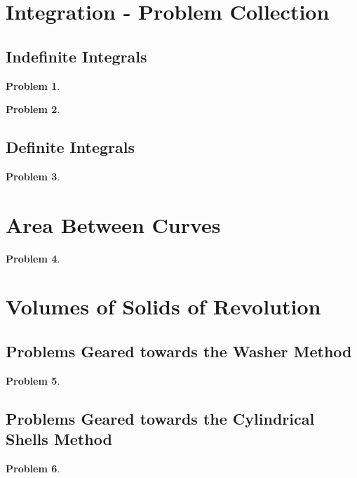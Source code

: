 \documentclass{article}
\newtheorem{problem}{Problem}
\begin{document}
\section{Integration - Problem Collection}
\subsection{Indefinite Integrals}
\begin{problem}

\end{problem}

\begin{problem}

\end{problem}
\subsection{Definite Integrals}
\begin{problem}

\end{problem}
\section{Area Between Curves}
\begin{problem}

\end{problem}

\section{Volumes of Solids of Revolution}
\subsection{Problems Geared towards the Washer Method}
\begin{problem}

\end{problem}

\subsection{Problems Geared towards the Cylindrical Shells Method}
\begin{problem}

\end{problem}
\end{document}
